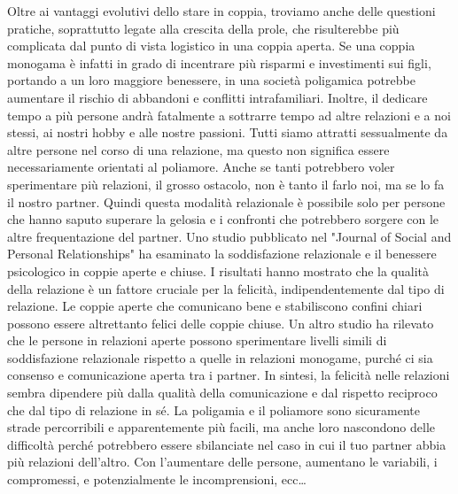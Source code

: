 \documentclass[12pt]{book} %
\begin{document}
Oltre ai vantaggi evolutivi dello stare in coppia, troviamo anche delle questioni pratiche, soprattutto legate alla
crescita della prole, che risulterebbe più complicata dal punto di vista logistico in una coppia aperta. 
Se una coppia monogama è infatti in grado di incentrare più
risparmi e investimenti sui figli, portando a un loro maggiore benessere, in una società poligamica potrebbe aumentare
il rischio di abbandoni e conflitti intrafamiliari. Inoltre, il dedicare tempo a più persone andrà
fatalmente a sottrarre tempo ad altre relazioni e a noi stessi, ai nostri hobby e alle nostre passioni. Tutti siamo
attratti sessualmente da altre persone nel corso di una relazione, ma questo non significa essere necessariamente
orientati al poliamore. Anche se tanti potrebbero voler sperimentare più relazioni, il grosso ostacolo, non è tanto il
farlo noi, ma se lo fa il nostro partner. Quindi questa modalità relazionale è possibile solo per persone che hanno saputo superare la gelosia e i confronti che potrebbero sorgere con le altre frequentazione del partner. 
Uno studio pubblicato nel "Journal of Social and Personal Relationships" ha esaminato la soddisfazione relazionale e il benessere psicologico in coppie aperte e chiuse. I risultati hanno mostrato che la qualità della relazione è un fattore cruciale per la felicità, indipendentemente dal tipo di relazione. Le coppie aperte che comunicano bene e stabiliscono confini chiari possono essere altrettanto felici delle coppie chiuse.
Un altro studio ha rilevato che le persone in relazioni aperte possono sperimentare livelli simili di soddisfazione relazionale rispetto a quelle in relazioni monogame, purché ci sia consenso e comunicazione aperta tra i partner.
In sintesi, la felicità nelle relazioni sembra dipendere più dalla qualità della comunicazione e dal rispetto reciproco che dal tipo di relazione in sé.
La poligamia e il poliamore sono sicuramente strade percorribili e apparentemente più facili, ma anche loro nascondono delle difficoltà perché potrebbero essere sbilanciate nel caso in cui il tuo partner abbia più relazioni dell'altro. Con l'aumentare delle persone, aumentano le variabili, i compromessi, e potenzialmente le incomprensioni, ecc…
\end{document}
